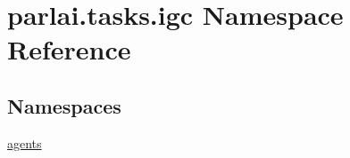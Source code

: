 \hypertarget{namespaceparlai_1_1tasks_1_1igc}{}\section{parlai.\+tasks.\+igc Namespace Reference}
\label{namespaceparlai_1_1tasks_1_1igc}
\subsection*{Namespaces}
\begin{DoxyCompactItemize}
\item 
 \hyperlink{namespaceparlai_1_1tasks_1_1igc_1_1agents}{agents}
\end{DoxyCompactItemize}
